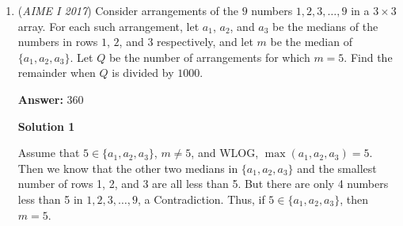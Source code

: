 \begin{enumerate}
 



\textbf{Solution 6 (Euclidean geometry and coordinates)}

If you've read Evan Chen's book EGMO (Euclidean Geometry in Mathematical Olympiads), you know that $\frac{z_3-z_1}{z_2-z_1}~\cdot~\frac{z-z_2}{z-z_3}$ is a real number is just a fancy way of saying that $z, z_1, z_2, z_3$ are points on a cyclic quadrilateral. The proof of this can be found in EGMO or other sources, and this is the key to the problem.

 And the three given points already define the circle that circumscribes that cyclic quadrilateral. So all we need to do is get the equation for that circle in the Cartesian plane, and then maximize the y-coordinate of $z$. 

 To find the center of the circumcircle, find the intersection of the perpendicular bisectors. One of them is just $y=61$, and the second is $y=-x+117$. So we have the point (56, 61) as the center of the circle. The distance from this point to all three points is $\sqrt{22^2+38^2}$. The square of the radius of this circle is $22^2+38^2=1928$. So the equation for the circle is $(x-56)^2+(y-61)^2=1928$. To maximize the y-coordinate, which does not have to be a positive integer, but $x$ does (per AIME rules given it's the answer), by the trivial inequality $(x-56)^2 \geq 0$, so $\boxed{056}$ is the answer.

 \href{https://mathproblemsolvingskills.wordpress.com/}{MathProblemSolvingSkills.com}

 


	\item (\textit{AIME I 2017}) Consider arrangements of the $9$ numbers $1, 2, 3, \dots, 9$ in a $3 \times 3$ array. For each such arrangement, let $a_1$, $a_2$, and $a_3$ be the medians of the numbers in rows $1$, $2$, and $3$ respectively, and let $m$ be the median of $\{a_1, a_2, a_3\}$. Let $Q$ be the number of arrangements for which $m = 5$. Find the remainder when $Q$ is divided by $1000$.


 
 \textbf{Answer: }360



\textbf{Solution 1}

Assume that $5 \in \{a_1, a_2, a_3\}$, $m \neq 5$, and WLOG, $\max{(a_1, a_2, a_3)} = 5$. Then we know that the other two medians in $\{a_1, a_2, a_3\}$ and the smallest number of rows 1, 2, and 3 are all less than 5. But there are only 4 numbers less than 5 in $1, 2, 3, \dots, 9$, a Contradiction. Thus, if $5 \in \{a_1, a_2, a_3\}$, then $m = 5$.


\end{enumerate}
